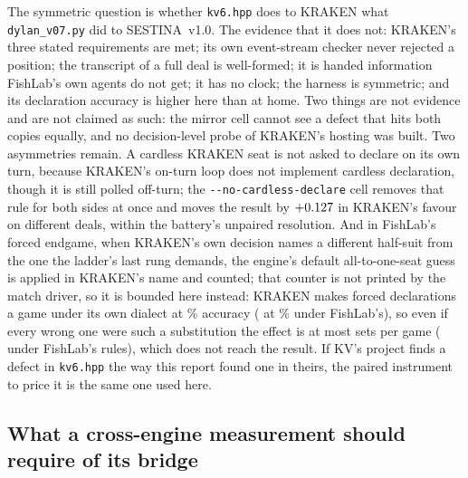 \documentclass[11pt]{article}
\newcommand{\code}[1]{\texttt{#1}}
\newcommand{\flag}[1]{\texttt{-{}-#1}}
\newcommand{\sestina}{\mbox{SESTINA v1.0}}
\newcommand{\pct}{\%}
\begin{document}
The symmetric question is whether \code{kv6.hpp} does to KRAKEN what \code{dylan\_v07.py} did to
\sestina{}. The evidence that it does not: KRAKEN's three stated requirements are met;
its own event-stream checker never rejected a position; the transcript of a full deal is well-formed;
it is handed information FishLab's own agents do not get; it has no clock; the harness is symmetric;
and its declaration accuracy is higher here than at home. Two things are not evidence and are not
claimed as such: the mirror cell cannot see a defect that hits both copies equally, and no
decision-level probe of KRAKEN's hosting was built. Two asymmetries remain. A cardless KRAKEN seat is
not asked to declare on its own turn, because KRAKEN's on-turn loop does not implement cardless
declaration, though it is still polled off-turn; the \flag{no-cardless-declare} cell removes that
rule for both sides at once and moves the result by $+0.127$ in KRAKEN's favour on
different deals, within the battery's unpaired resolution. And in
FishLab's forced endgame, when KRAKEN's own decision names a different half-suit from the one the
ladder's last rung demands, the engine's default all-to-one-seat guess is applied in KRAKEN's name and
counted; that counter is not printed by the match driver, so it is bounded here instead: KRAKEN makes
\kcENoootForcedPerGame{} forced declarations a game under its own dialect at \kcENoootForcedAcc\pct{}
accuracy (\kcEDefaultForcedPerGame{} at \kcEDefaultForcedAcc\pct{} under FishLab's), so even if every
wrong one were such a substitution the effect is at most \kcENoootFallbackBound{} sets per game
(\kcEDefaultFallbackBound{} under FishLab's rules), which does not reach the result. If KV's project
finds a defect in \code{kv6.hpp} the way this report found one in theirs, the paired instrument to
price it is the same one used here.

\subsection{What a cross-engine measurement should require of its bridge}
\end{document}
